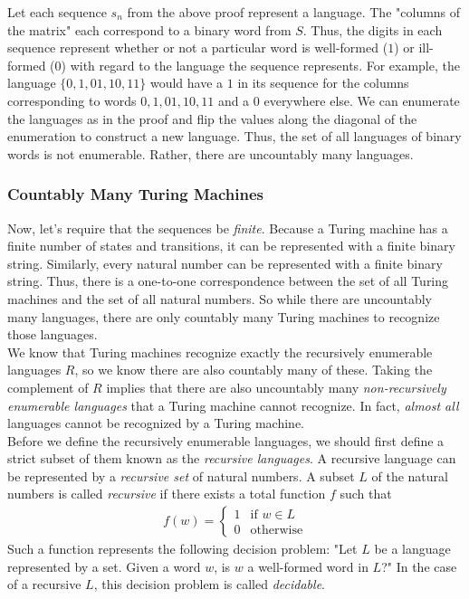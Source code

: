 Let each sequence $s_n$ from the above proof represent a language. The "columns of the matrix" each correspond to a binary word from $S$. Thus, the digits in each sequence represent whether or not a particular word is well-formed ($1$) or ill-formed ($0$) with regard to the language the sequence represents. For example, the language $\{0,1,01,10,11\}$ would have a $1$ in its sequence for the columns corresponding to words $0,1,01,10,11$ and a $0$ everywhere else. We can enumerate the languages as in the proof and flip the values along the diagonal of the enumeration to construct a new language. Thus, the set of all languages of binary words is not enumerable. Rather, there are uncountably many languages. \\

\subsubsection{Countably Many Turing Machines}

Now, let's require that the sequences be \textit{finite}. Because a Turing machine has a finite number of states and transitions, it can be represented with a finite binary string. Similarly, every natural number can be represented with a finite binary string. Thus, there is a one-to-one correspondence between the set of all Turing machines and the set of all natural numbers. So while there are uncountably many languages, there are only countably many Turing machines to recognize those languages. \\

We know that Turing machines recognize exactly the recursively enumerable languages $R$, so we know there are also countably many of these. Taking the complement of $R$ implies that there are also uncountably many \textit{non-recursively enumerable languages} that a Turing machine cannot recognize. In fact, \textit{almost all} languages cannot be recognized by a Turing machine. \\

Before we define the recursively enumerable languages, we should first define a strict subset of them known as the \textit{recursive languages}. A recursive language can be represented by a \textit{recursive set} of natural numbers. A subset $L$ of the natural numbers is called \textit{recursive} if there exists a total function $f$ such that
\begin{align*}
	f(w)=
	\begin{cases}
		1 & \text{if } w\in L \\
		0 & \text{otherwise}
	\end{cases}
\end{align*}
Such a function represents the following decision problem: "Let $L$ be a language represented by a set. Given a word $w$, is $w$ a well-formed word in $L$?" In the case of a recursive $L$, this decision problem is called \textit{decidable}. \\

